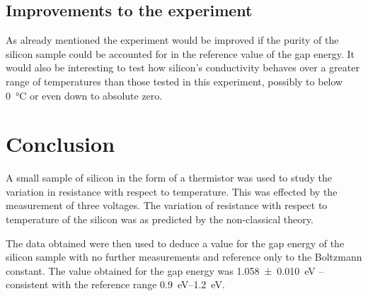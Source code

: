 \documentclass[12pt]{article}
\begin{document}
\subsection{Improvements to the experiment}
As already mentioned the experiment would be improved if the purity of the silicon sample could be accounted for in the reference value of the gap energy. It would also be interesting to test how silicon's conductivity behaves over a greater range of temperatures than those tested in this experiment, possibly to below \SI{0}{\celsius} or even down to absolute zero.

\section{Conclusion}
A small sample of silicon in the form of a thermistor was used to study the variation in resistance with respect to temperature. This was effected by the measurement of three voltages. The variation of resistance with respect to temperature of the silicon was as predicted by the non-classical theory.

The data obtained were then used to deduce a value for the gap energy of the silicon sample with no further measurements and reference only to the Boltzmann constant. The value obtained for the gap energy was \SI{1.058 \pm 0.010}{\electronvolt} -- consistent with the reference range \SIrange{0.9}{1.2}{\electronvolt}.



\end{document}
